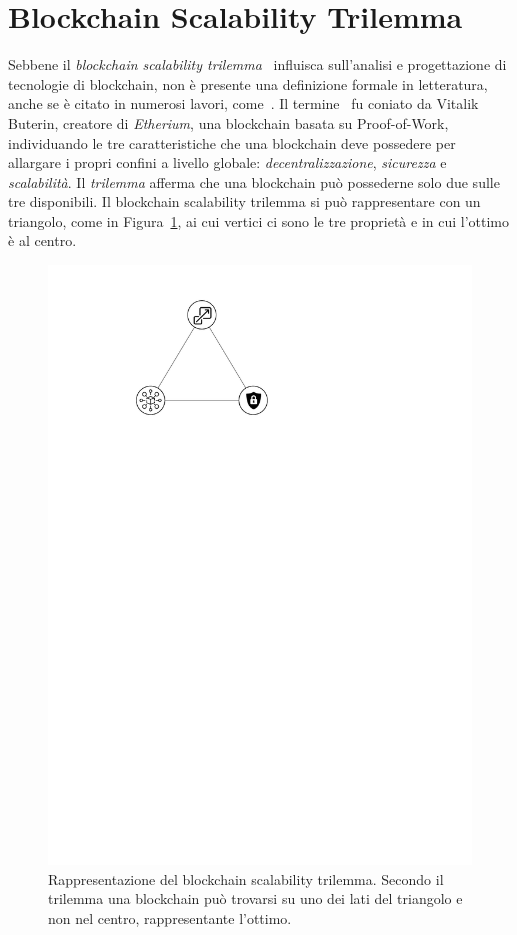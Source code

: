 \section{Blockchain Scalability Trilemma}
Sebbene il \emph{blockchain scalability trilemma}~\cite{trilemma1} influisca sull'analisi e progettazione di tecnologie di blockchain, non è presente una definizione formale in letteratura, anche se è citato in numerosi lavori, come~\cite{xie2019survey, zhou2020solutions}. Il termine~\cite{sharding2020site} fu coniato da Vitalik Buterin, creatore di \emph{Etherium}, una blockchain basata su Proof-of-Work, individuando le tre caratteristiche che una blockchain deve possedere per allargare i propri confini a livello globale: \emph{decentralizzazione}, \emph{sicurezza} e \emph{scalabilità}. Il \emph{trilemma} afferma che una blockchain può possederne solo due sulle tre disponibili. Il blockchain scalability trilemma si può rappresentare con un triangolo, come in Figura~\ref{fig:trilemma}, ai cui vertici ci sono le tre proprietà e in cui l'ottimo è al centro.

\begin{figure}
	\centering
	\includegraphics{img/capuno/trilemma.pdf}
	\caption{Rappresentazione del blockchain scalability trilemma. Secondo il trilemma una blockchain può trovarsi su uno dei lati del triangolo e non nel centro, rappresentante l'ottimo.}
	\label{fig:trilemma}
\end{figure}

